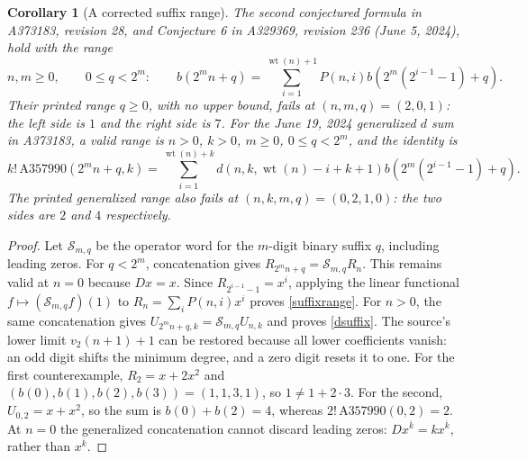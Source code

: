 \documentclass[11pt]{article}
\newcommand{\wt}{\operatorname{wt}}
\newtheorem{corollary}[theorem]{Corollary}
\begin{document}
\begin{corollary}[A corrected suffix range]\label{suffix}
The second conjectured formula in A373183, revision 28, and
Conjecture 6 in A329369, revision 236 (June 5, 2024), hold with the range
\begin{equation}\label{suffixrange}
 n,m\geq0,\qquad 0\leq q<2^m:
 \qquad b(2^mn+q)=\sum_{i=1}^{\wt(n)+1}
 P(n,i)b(2^m(2^{i-1}-1)+q).
\end{equation}
Their printed range $q\geq0$, with no upper bound, fails at
$(n,m,q)=(2,0,1)$: the left side is $1$ and the right side is $7$.
For the June 19, 2024 generalized $d$ sum in A373183, a valid range is
$n>0$, $k>0$, $m\geq0$, $0\leq q<2^m$, and the identity is
\begin{equation}\label{dsuffix}
 k!\,\mathrm{A357990}(2^mn+q,k)
 =\sum_{i=1}^{\wt(n)+k}d(n,k,\wt(n)-i+k+1)
       b(2^m(2^{i-1}-1)+q).
\end{equation}
The printed generalized range also fails at $(n,k,m,q)=(0,2,1,0)$:
the two sides are $2$ and $4$ respectively.
\end{corollary}
\begin{proof}
Let $\mathcal S_{m,q}$ be the operator word for the $m$-digit binary
suffix $q$, including leading zeros. For $q<2^m$, concatenation gives
$R_{2^mn+q}=\mathcal S_{m,q}R_n$.
This remains valid at $n=0$ because $Dx=x$.
Since $R_{2^{i-1}-1}=x^i$, applying the linear functional
$f\mapsto(\mathcal S_{m,q}f)(1)$ to
$R_n=\sum_iP(n,i)x^i$ proves \eqref{suffixrange}.
For $n>0$, the same concatenation gives
$U_{2^mn+q,k}=\mathcal S_{m,q}U_{n,k}$ and proves \eqref{dsuffix}.
The source's lower limit $v_2(n+1)+1$ can be restored because all lower
coefficients vanish: an odd digit shifts the minimum degree, and a zero
digit resets it to one.
For the first counterexample, $R_2=x+2x^2$ and
$(b(0),b(1),b(2),b(3))=(1,1,3,1)$, so $1\ne1+2\cdot3$.
For the second, $U_{0,2}=x+x^2$, so the sum is $b(0)+b(2)=4$,
whereas $2!\,\mathrm{A357990}(0,2)=2$.
At $n=0$ the generalized concatenation cannot discard leading zeros:
$Dx^{\overline k}=kx^{\overline k}$, rather than $x^{\overline k}$.
\end{proof}
\end{document}
